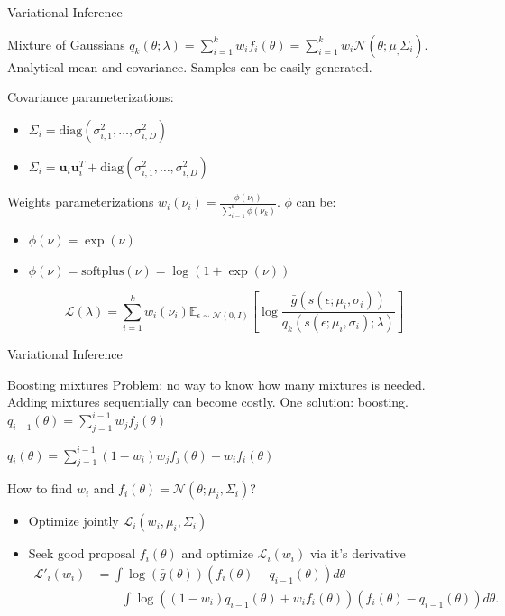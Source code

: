 \documentclass[pdf]{beamer}
\def \Ev {{\mathbb E}}
\def \u {{\mathbf u}}
\def \gu {{\bar{g}}}
\begin{document}
\begin{frame}{Variational Inference}
\begin{block}{Mixture of Gaussians}
$q_k(\theta;\lambda) = \sum_{i=1}^k w_i f_i(\theta) = \sum_{i=1}^k w_i \mathcal{N}(\theta;\mu_,\Sigma_i)$. Analytical mean and covariance. Samples can be easily generated.

Covariance parameterizations: 
\begin{itemize}
	\item $\Sigma_i = \text{diag}(\sigma_{i,1}^2,\ldots,\sigma_{i,D}^2)$
	\item $\Sigma_i = \u_i \u_i^T + \text{diag}(\sigma_{i,1}^2,\ldots,\sigma_{i,D}^2)$
\end{itemize}

Weights parameterizations $w_i(\nu_i) = \frac{\phi(\nu_i)}{\sum_{i=1}^k \phi(\nu_k)}$. $\phi$ can be:
\begin{itemize}
	\item $\phi(\nu) = \exp(\nu)$
	\item $\phi(\nu) = \text{softplus}(\nu) = \log(1+\exp(\nu))$
\end{itemize}
\begin{equation*}
\mathcal{L}(\lambda) = \sum_{i=1}^k w_i(\nu_i) \Ev_{\epsilon \sim \mathcal{N}(0,I)}\left[\log \frac{ \gu(s(\epsilon;\mu_i,\sigma_i))}{q_k(s(\epsilon;\mu_i,\sigma_i);\lambda)}\right]
\end{equation*}

\end{block}
\end{frame}

\begin{frame}{Variational Inference}
\begin{block}{Boosting mixtures}
Problem: no way to know how many mixtures is needed. Adding mixtures sequentially can become costly. One solution: boosting.
$q_{i-1}(\theta) = \sum_{j=1}^{i-1} w_j f_j(\theta)$

$q_{i}(\theta) = \sum_{j=1}^{i-1} (1-w_{i}) w_j f_j(\theta) + w_{i} f_i(\theta)$

How to find $w_{i}$ and $f_i(\theta) = \mathcal{N}(\theta;\mu_{i},\Sigma_{i})$?
\begin{itemize}
	\item Optimize jointly $\mathcal{L}_{i}(w_{i},\mu_{i},\Sigma_{i})$
	\item Seek good proposal $f_i(\theta)$ and optimize $\mathcal{L}_{i}(w_{i})$ via it's derivative
\begin{equation*}
\begin{split}
	\mathcal{L}'_{i}(w_{i}) & = \int \log (\gu(\theta)) (f_{i}(\theta) - q_{i-1}(\theta)) d\theta - \\
	& \qquad{} \int \log((1-w_{i}) q_{i-1}(\theta) + w_{i} f_{i}(\theta)) (f_i(\theta) - q_{i-1}(\theta)) d\theta.
\end{split}
\end{equation*}
\end{itemize}
\end{block}
\end{frame}
\end{document}
